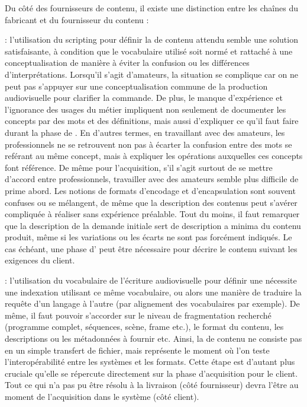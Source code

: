 Du côté des fournisseurs de contenu, il existe une distinction entre les chaînes du fabricant et du fournisseur du contenu :  

\begin{liste}
	\item {} : l'utilisation du scripting pour définir la  de contenu attendu semble une solution satisfaisante, à condition que le vocabulaire utilisé soit normé et rattaché à une conceptualisation de manière à éviter la confusion ou les différences d'interprétations. 
    Lorsqu'il s'agit d'amateurs, la situation se complique car on ne peut pas s'appuyer sur une conceptualisation commune de la production audiovisuelle pour clarifier la commande. 
    De plus, le manque d'expérience et l'ignorance des usages du métier impliquent non seulement de documenter les concepts par des mots et des définitions, mais aussi d'expliquer ce qu'il faut faire durant la phase de . 
    En d'autres termes, en travaillant avec des amateurs, les professionnels ne se retrouvent non pas à écarter la confusion entre des mots se reférant au même concept, mais à expliquer les opérations auxquelles ces concepts font référence. 
    De même pour l'acquisition, s'il s'agit surtout de se mettre d'accord entre professionnels, travailler avec des amateurs semble plus difficile de prime abord. 
    Les notions de formats d'encodage et d'encapsulation sont souvent confuses ou se mélangent, de même que la description des contenus peut s'avérer compliquée à réaliser sans expérience préalable. 
    Tout du moins, il faut remarquer que la description de la demande initiale sert de description a minima du contenu produit, même si les variations ou les écarts ne sont pas forcément indiqués.
    Le cas échéant, une phase d' peut être nécessaire pour décrire le contenu suivant les exigences du client.\\

	\item {} : l'utilisation du vocabulaire de l'écriture audiovisuelle pour définir une  nécessite une indexation utilisant ce même vocabulaire, ou alors une manière de traduire la requête d'un langage à l'autre (par alignement des vocabulaires par exemple). 
	De même, il faut pouvoir s'accorder sur le niveau de fragmentation recherché (programme complet, séquences, scène, frame etc.), le format du contenu, les descriptions ou les métadonnées à fournir etc.
	Ainsi, la  de contenu ne consiste pas en un simple transfert de fichier, mais représente le moment où l'on teste l'interopérabilité entre les systèmes et les formats. 
	Cette étape est d'autant plus cruciale qu'elle se répercute directement sur la phase d'acquisition pour le client. 
	Tout ce qui n'a pas pu être résolu à la livraison (côté fournisseur) devra l'être au moment de l'acquisition dans le système (côté client).\\
\end{liste}



